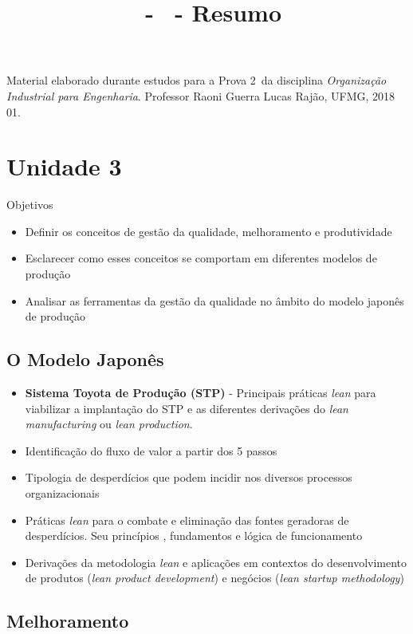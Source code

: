 \documentclass{article}
\title{\ufmgdisciplina\,  - \ufmgtema \, - Resumo}
\author{\ufmgestudante}
\date{\ufmgsemestre}
\newcommand{\ufmgdisciplina}{Organização Industrial para Engenharia}
\newcommand{\ufmgtema}{Prova 2}
\newcommand{\ufmgsemestre}{2018 01}
\newcommand{\ufmgprofessor}{Raoni Guerra Lucas Rajão}
\begin{document}
\maketitle

Material elaborado durante estudos para a \ufmgtema \,  da disciplina \emph{\ufmgdisciplina}. Professor \ufmgprofessor, UFMG, \ufmgsemestre.

\section{Unidade 3}

Objetivos

\begin{itemize}
    \item Definir os conceitos de gestão da qualidade, melhoramento e produtividade
    \item Esclarecer como esses conceitos se comportam em diferentes modelos de produção
    \item Analisar as ferramentas da gestão da qualidade no âmbito do modelo japonês de produção
\end{itemize}

\subsection{O Modelo Japonês}

\begin{itemize}
    \item \textbf{Sistema Toyota de Produção (STP)} - Principais práticas \textit{lean} para viabilizar a implantação do STP e as diferentes derivações do \textit{lean manufacturing} ou \textit{lean production}.
    \item Identificação do fluxo de valor a partir dos 5 passos
    \item Tipologia de desperdícios que podem incidir nos diversos processos organizacionais
    \item Práticas \textit{lean} para o combate e eliminação das fontes geradoras de desperdícios. Seu princípios , fundamentos e lógica de funcionamento
    \item Derivações da metodologia \textit{lean} e aplicações em contextos do desenvolvimento de produtos (\textit{lean product development}) e negócios (\textit{lean startup methodology})
\end{itemize}

\subsection{Melhoramento}
\end{document}
